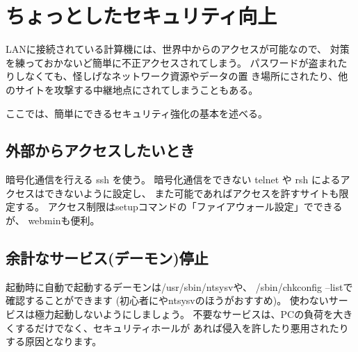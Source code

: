 \documentclass{jreport}
\begin{document}
\section{ちょっとしたセキュリティ向上}

LANに接続されている計算機には、世界中からのアクセスが可能なので、
対策を練っておかないど簡単に不正アクセスされてしまう。
パスワードが盗まれたりしなくても、怪しげなネットワーク資源やデータの置
き場所にされたり、他のサイトを攻撃する中継地点にされてしまうこともある。 

ここでは、簡単にできるセキュリティ強化の基本を述べる。


\subsection{外部からアクセスしたいとき}

暗号化通信を行える ssh を使う。
暗号化通信をできない telnet や rsh によるアクセスはできないように設定し、
また可能であればアクセスを許すサイトも限定する。
アクセス制限はsetupコマンドの「ファイアウォール設定」でできるが、
webminも便利。


\subsection{余計なサービス(デーモン)停止}

起動時に自動で起動するデーモンは{\ttfamily /usr/sbin/ntsysv}や、
{\ttfamily /sbin/chkconfig --list}で確認することができます
(初心者にやntsysvのほうがおすすめ)。
使わないサービスは極力起動しないようにしましょう。
不要なサービスは、PCの負荷を大きくするだけでなく、セキュリティホールが
あれば侵入を許したり悪用されたりする原因となります。





\end{document}
